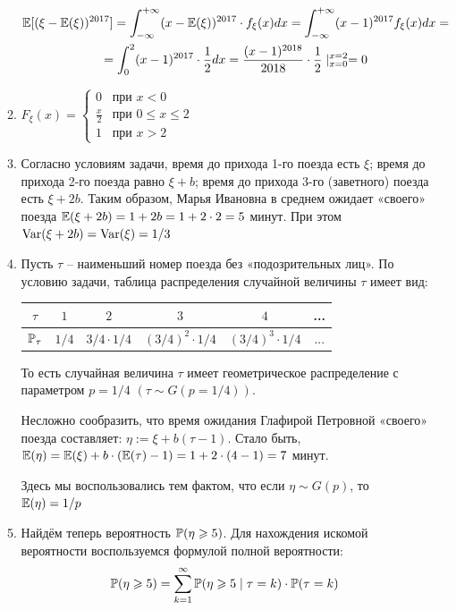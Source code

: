 \documentclass[12pt, a4paper]{article}\usepackage[]{graphicx}\usepackage[]{color}
\begin{document}
\begin{enumerate}
\begin{enumerate}
\begin{multline*}
								\E [ (\xi - \E(\xi))^{2017} ] = \int_{-\infty}^{+\infty} (x- \E(\xi) )^{2017} \cdot f_{\xi} (x) dx = \int_{-\infty}^{+\infty} (x-1)^{2017} f_{\xi} (x) dx = \\
								= \int_{0}^{2} (x-1)^{2017} \cdot \frac{1}{2} dx = \frac{(x-1)^{2018}}{2018} \cdot \frac{1}{2} \mid_{x=0}^{x=2} =0
								\end{multline*}
								\item $F_{\xi} (x) =
								\begin{cases}
								0 & \text{при } x < 0 \\
								\frac{x}{2} & \text{при } 0 \leq x \leq 2 \\
								1 & \text{при } x > 2
								\end{cases}
								$
								\item Согласно условиям задачи, время до прихода 1-го поезда есть $\xi$; время до прихода 2-го поезда равно $\xi + b$; время до прихода 3-го (заветного) поезда есть $\xi + 2b$. Таким образом, Марья Ивановна в среднем ожидает «своего» поезда $\E (\xi + 2b) = 1 + 2b = 1 + 2 \cdot 2 = 5 $ минут. При этом $\Var (\xi + 2b) = \Var (\xi) = 1/3$
								\item Пусть $\tau$ – наименьший номер поезда без «подозрительных лиц». По условию задачи, таблица распределения случайной величины $\tau$ имеет вид:

								\begin{tabular}{c|ccccc}
									$\tau$ & $ 1 $ & $2$ & $3$ & $4$ & ... \\
									\hline
									$\P_{\tau}$ & $1/4$ & $3/4\cdot1/4$ & $(3/4)^2 \cdot 1/4$ & $(3/4)^3 \cdot 1/4$ & ...\\
								\end{tabular}

								То есть случайная величина $\tau$ имеет геометрическое распределение с параметром $p=1/4$ $(\tau \sim G(p=1/4))$.

								Несложно сообразить, что время ожидания Глафирой Петровной «своего» поезда составляет: $\eta := \xi + b(\tau- 1)$. Стало быть, $\E (\eta) = \E (\xi) + b \cdot (\E(\tau)-1)  = 1 + 2 \cdot (4-1) = 7$ минут.

								Здесь мы воспользовались тем фактом, что если $\eta \sim G(p)$, то $\E (\eta) = 1/p$
								\item Найдём теперь вероятность $\P (\eta \geq 5 )$. Для нахождения искомой вероятности воспользуемся формулой полной вероятности:
								\[
								\P (\eta \geq 5 ) = \sum_{k=1}^{\infty} \P ( \eta \geq 5   \mid \tau = k ) \cdot \P(\tau = k )
								\]


\end{enumerate}
\end{enumerate}
\end{document}
